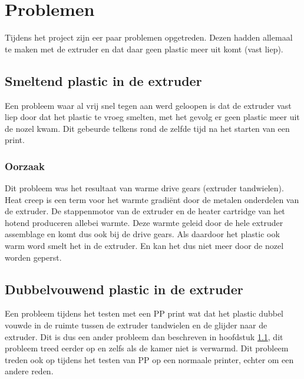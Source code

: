 \chapter{Problemen}
\label{Problemen}

Tijdens het project zijn eer paar problemen opgetreden. Dezen hadden allemaal
te maken met de extruder en dat daar geen plastic meer uit komt (vast liep).

\section{Smeltend plastic in de extruder}
\label{s:smeltendplastic}

Een probleem waar al vrij snel tegen aan werd geloopen is dat de extruder vast
liep door dat het plastic te vroeg smelten, met het gevolg er geen plastic meer uit de nozel kwam.
Dit gebeurde telkens rond de zelfde tijd na het starten van een print.

\subsection{Oorzaak}

Dit probleem was het resultaat van warme drive gears (extruder tandwielen).
Heat creep is een term voor het warmte gradiënt door de metalen onderdelen van
de extruder. De stappenmotor van de extruder en de heater cartridge van het
hotend produceren allebei warmte. Deze warmte geleid door de hele extruder
assemblage en komt dus ook bij de drive gears. Als daardoor het plastic ook
warm word smelt het in de extruder. En kan het dus niet meer door de nozel
worden geperst.

\section{Dubbelvouwend plastic in de extruder}
\label{s:Dubbelvouwend}

Een probleem tijdens het testen met een PP print wat dat het plastic dubbel
vouwde in de ruimte tussen de extruder tandwielen en de glijder naar de
extruder. Dit is dus een ander probleem dan beschreven in hoofdstuk
\ref{s:smeltendplastic}, dit probleem treed eerder op en zelfs als de kamer
niet is verwarmd. Dit probleem treden ook op tijdens het testen van PP op een
normaale printer, echter om een andere reden.

